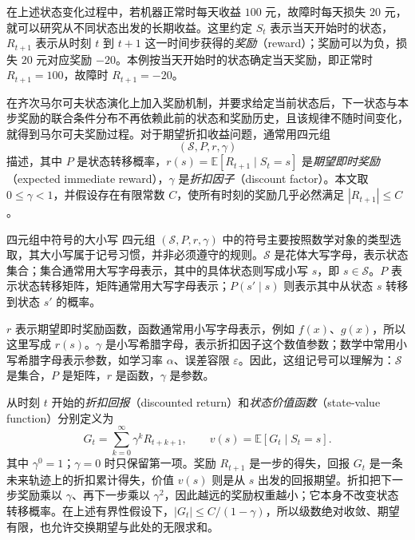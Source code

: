 \documentclass[UTF8,12pt,a4paper,fontset=fandol]{ctexart}
\begin{document}
在上述状态变化过程中，若机器正常时每天收益 $100$ 元，故障时每天损失 $20$ 元，就可以研究从不同状态出发的长期收益。这里约定 $S_t$ 表示当天开始时的状态，$R_{t+1}$ 表示从时刻 $t$ 到 $t+1$ 这一时间步获得的\emph{奖励}（reward）；奖励可以为负，损失 $20$ 元对应奖励 $-20$。本例按当天开始时的状态确定当天奖励，即正常时 $R_{t+1}=100$，故障时 $R_{t+1}=-20$。

\begin{definition}[马尔可夫奖励过程]
在齐次马尔可夫状态演化上加入奖励机制，并要求给定当前状态后，下一状态与本步奖励的联合条件分布不再依赖此前的状态和奖励历史，且该规律不随时间变化，就得到马尔可夫奖励过程。对于期望折扣收益问题，通常用四元组
\[
  (\mathcal S,P,r,\gamma)
\]
描述，其中 $P$ 是状态转移概率，$r(s)=\mathbb E[R_{t+1}\mid S_t=s]$ 是\emph{期望即时奖励}（expected immediate reward），$\gamma$ 是\emph{折扣因子}（discount factor）。本文取 $0\leq\gamma<1$，并假设存在有限常数 $C$，使所有时刻的奖励几乎必然满足 $|R_{t+1}|\leq C$。
\end{definition}

\begin{remarkbox}[label={rem:markov-three-symbol-conventions}]{四元组中符号的大小写}
四元组 $(\mathcal S,P,r,\gamma)$ 中的符号主要按照数学对象的类型选取，其大小写属于记号习惯，并非必须遵守的规则。$\mathcal S$ 是花体大写字母，表示状态集合；集合通常用大写字母表示，其中的具体状态则写成小写 $s$，即 $s\in\mathcal S$。$P$ 表示状态转移矩阵，矩阵通常用大写字母表示；$P(s'\mid s)$ 则表示其中从状态 $s$ 转移到状态 $s'$ 的概率。

\tcblower
$r$ 表示期望即时奖励函数，函数通常用小写字母表示，例如 $f(x)$、$g(x)$，所以这里写成 $r(s)$。$\gamma$ 是小写希腊字母，表示折扣因子这个数值参数；数学中常用小写希腊字母表示参数，如学习率 $\alpha$、误差容限 $\varepsilon$。因此，这组记号可以理解为：$\mathcal S$ 是集合，$P$ 是矩阵，$r$ 是函数，$\gamma$ 是参数。
\end{remarkbox}

从时刻 $t$ 开始的\emph{折扣回报}（discounted return）和\emph{状态价值函数}（state-value function）分别定义为
\begin{equation}
  G_t=\sum_{k=0}^{\infty}\gamma^kR_{t+k+1},
  \qquad
  v(s)=\mathbb E[G_t\mid S_t=s].
  \label{eq:markov-three-return}
\end{equation}
其中 $\gamma^0=1$；$\gamma=0$ 时只保留第一项。奖励 $R_{t+1}$ 是一步的得失，回报 $G_t$ 是一条未来轨迹上的折扣累计得失，价值 $v(s)$ 则是从 $s$ 出发的回报期望。折扣把下一步奖励乘以 $\gamma$、再下一步乘以 $\gamma^2$，因此越远的奖励权重越小；它本身不改变状态转移概率。在上述有界性假设下，$|G_t|\leq C/(1-\gamma)$，所以级数绝对收敛、期望有限，也允许交换期望与此处的无限求和。
\end{document}

